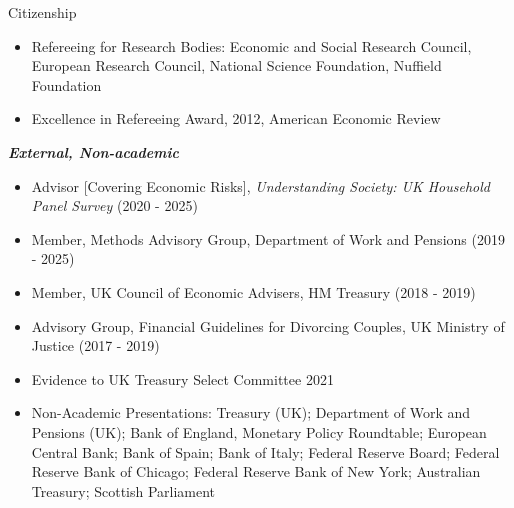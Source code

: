 \documentclass{resume} %
\begin{document}
\begin{rSection}{Citizenship}
\begin{itemize}
\item Refereeing for Research Bodies: Economic and Social Research Council, European Research Council, National Science Foundation, Nuffield Foundation
\item Excellence in Refereeing Award, 2012, American Economic Review
\end{itemize}

\item \textit{\textbf{External, Non-academic}}
\begin{itemize} 
\item Advisor [Covering Economic Risks], \textit{Understanding Society: UK Household Panel Survey} (2020 - 2025)
\item Member, Methods Advisory Group, Department of Work and Pensions (2019 - 2025)
\item Member, UK Council of Economic Advisers, HM Treasury (2018 - 2019)
\item Advisory Group, Financial Guidelines for Divorcing Couples, UK Ministry of Justice (2017 - 2019)
\item Evidence to UK Treasury Select Committee 2021
\item Non-Academic Presentations: Treasury (UK); Department of Work and Pensions (UK); Bank of England, Monetary Policy Roundtable; European Central Bank; Bank of Spain; Bank of Italy; Federal Reserve Board; Federal Reserve Bank of Chicago; Federal Reserve Bank of New York; Australian Treasury; Scottish Parliament  
\end{itemize}

    
\end{rSection}
\end{document}

